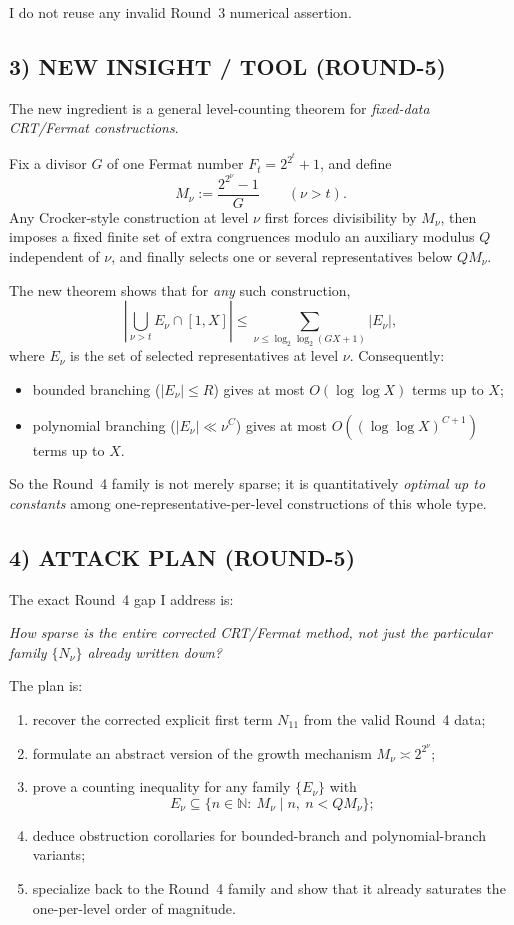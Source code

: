 I do not reuse any invalid Round~3 numerical assertion.

\subsection*{3) NEW INSIGHT / TOOL (ROUND-5)}

The new ingredient is a general level-counting theorem for \emph{fixed-data CRT/Fermat constructions}.

\medskip
Fix a divisor $G$ of one Fermat number $F_t=2^{2^t}+1$, and define
\[
M_\nu:=\frac{2^{2^\nu}-1}{G}\qquad (\nu>t).
\]
Any Crocker-style construction at level $\nu$ first forces divisibility by $M_\nu$, then imposes a fixed finite set of extra congruences modulo an auxiliary modulus $Q$ independent of $\nu$, and finally selects one or several representatives below $QM_\nu$.

The new theorem shows that for \emph{any} such construction,
\[
\left|\bigcup_{\nu>t}E_\nu\cap [1,X]\right|
\le
\sum_{\nu\le \log_2\log_2(GX+1)} |E_\nu|,
\]
where $E_\nu$ is the set of selected representatives at level $\nu$. Consequently:

\begin{itemize}
\item bounded branching ($|E_\nu|\le R$) gives at most $O(\log\log X)$ terms up to $X$;
\item polynomial branching ($|E_\nu|\ll \nu^C$) gives at most $O((\log\log X)^{C+1})$ terms up to $X$.
\end{itemize}

So the Round~4 family is not merely sparse; it is quantitatively \emph{optimal up to constants} among one-representative-per-level constructions of this whole type.

\subsection*{4) ATTACK PLAN (ROUND-5)}

The exact Round~4 gap I address is:

\medskip
\noindent\emph{How sparse is the \emph{entire} corrected CRT/Fermat method, not just the particular family $\{N_\nu\}$ already written down?}

\medskip
The plan is:

\begin{enumerate}
\item recover the corrected explicit first term $N_{11}$ from the valid Round~4 data;
\item formulate an abstract version of the growth mechanism $M_\nu\asymp 2^{2^\nu}$;
\item prove a counting inequality for any family $\{E_\nu\}$ with
\[
E_\nu\subseteq \{n\in\mathbb N:\ M_\nu\mid n,\ n<QM_\nu\};
\]
\item deduce obstruction corollaries for bounded-branch and polynomial-branch variants;
\item specialize back to the Round~4 family and show that it already saturates the one-per-level order of magnitude.
\end{enumerate}

